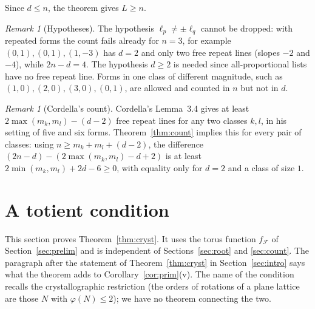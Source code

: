 \documentclass[11pt]{amsart}
\theoremstyle{definition}
\theoremstyle{remark}
\newtheorem{remark}[theorem]{Remark}
\begin{document}
Since $d\le n$, the theorem gives $L\ge n$.

\begin{remark}[Hypotheses]
The hypothesis $\ell_p\ne\pm\ell_q$ cannot be dropped: with repeated forms the count fails already for $n=3$, for example $(0,1),(0,1),(1,-3)$ has $d=2$ and only two free repeat lines (slopes $-2$ and $-4$), while $2n-d=4$. The hypothesis $d\ge2$ is needed since all-proportional lists have no free repeat line. Forms in one class of different magnitude, such as $(1,0),(2,0),(3,0),(0,1)$, are allowed and counted in $n$ but not in $d$.
\end{remark}

\begin{remark}[Cordella's count]
Cordella's Lemma~3.4 gives at least $2\max(m_k,m_l)-(d-2)$ free repeat lines for any two classes $k,l$, in his setting of five and six forms. Theorem~\ref{thm:count} implies this for every pair of classes: using $n\ge m_k+m_l+(d-2)$, the difference $(2n-d)-(2\max(m_k,m_l)-d+2)$ is at least $2\min(m_k,m_l)+2d-6\ge0$, with equality only for $d=2$ and a class of size $1$.
\end{remark}

\section{A totient condition}\label{sec:cryst}

This section proves Theorem~\ref{thm:cryst}. It uses the torus function $f_{\mathcal F}$ of Section~\ref{sec:prelim} and is independent of Sections~\ref{sec:root} and \ref{sec:count}. The paragraph after the statement of Theorem~\ref{thm:cryst} in Section~\ref{sec:intro} says what the theorem adds to Corollary~\ref{cor:prim}(v). The name of the condition recalls the crystallographic restriction (the orders of rotations of a plane lattice are those $N$ with $\varphi(N)\le2$); we have no theorem connecting the two.
\end{document}
